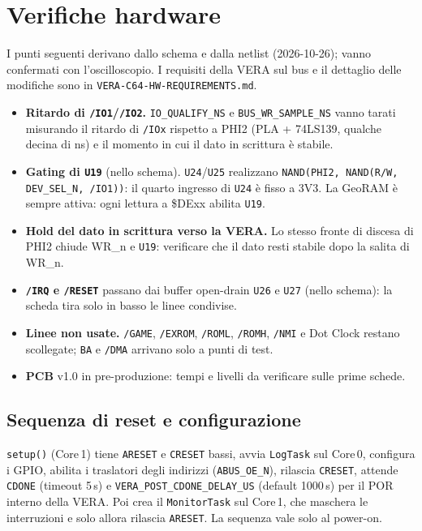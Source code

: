 \documentclass[12pt, a4paper]{article}
\begin{document}
\section{Verifiche hardware}
\label{sec:hwverif}
I punti seguenti derivano dallo schema e dalla netlist (2026-10-26); vanno confermati con l'oscilloscopio. I requisiti della VERA sul bus e il dettaglio delle modifiche sono in \texttt{VERA-C64-HW-REQUIREMENTS.md}.

\begin{itemize}
  \item \textbf{Ritardo di \texttt{/IO1}/\texttt{/IO2}.} \texttt{IO\_QUALIFY\_NS} e \texttt{BUS\_WR\_SAMPLE\_NS} vanno tarati misurando il ritardo di \texttt{/IOx} rispetto a PHI2 (PLA + 74LS139, qualche decina di ns) e il momento in cui il dato in scrittura è stabile.
  \item \textbf{Gating di \texttt{U19}} (nello schema). \texttt{U24}/\texttt{U25} realizzano \texttt{NAND(PHI2, NAND(R/W, DEV\_SEL\_N, /IO1))}: il quarto ingresso di \texttt{U24} è fisso a 3V3. La GeoRAM è sempre attiva: ogni lettura a \$DExx abilita \texttt{U19}.
  \item \textbf{Hold del dato in scrittura verso la VERA.} Lo stesso fronte di discesa di PHI2 chiude WR\_n e \texttt{U19}: verificare che il dato resti stabile dopo la salita di WR\_n.
  \item \textbf{\texttt{/IRQ} e \texttt{/RESET}} passano dai buffer open-drain \texttt{U26} e \texttt{U27} (nello schema): la scheda tira solo in basso le linee condivise.
  \item \textbf{Linee non usate.} \texttt{/GAME}, \texttt{/EXROM}, \texttt{/ROML}, \texttt{/ROMH}, \texttt{/NMI} e Dot Clock restano scollegate; \texttt{BA} e \texttt{/DMA} arrivano solo a punti di test.
  \item \textbf{PCB} v1.0 in pre-produzione: tempi e livelli da verificare sulle prime schede.
\end{itemize}

\subsection*{Sequenza di reset e configurazione}
\texttt{setup()} (Core\,1) tiene \texttt{ARESET} e \texttt{CRESET} bassi, avvia \texttt{LogTask} sul Core\,0, configura i GPIO, abilita i traslatori degli indirizzi (\texttt{ABUS\_OE\_N}), rilascia \texttt{CRESET}, attende \texttt{CDONE} (timeout 5\,s) e \texttt{VERA\_POST\_CDONE\_DELAY\_US} (default 1000\,\textmu s) per il POR interno della VERA. Poi crea il \texttt{MonitorTask} sul Core\,1, che maschera le interruzioni e solo allora rilascia \texttt{ARESET}. La sequenza vale solo al power-on.
\end{document}
